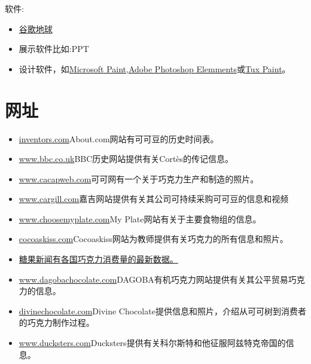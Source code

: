 软件:\par
\begin{itemize}
  \item \href{http://www.earth.google.com}{谷歌地球}
  \item 展示软件比如:PPT
  \item 设计软件，如\href{microsoft.com}{Microsoft Paint},\href{adobe.com}{Adobe Photoshop Elemments}或\href{tuxpaint.org}{Tux Paint}。
\end{itemize}




\section{网址}


\begin{itemize}
  \item \href{http://inventors.about.com/od/foodrelatedinventions/a/chocolate.htm}{inventors.com}About.com网站有可可豆的历史时间表。
  \item \href{http://www.bbc.co.uk/history/historic_ﬁgures/cortes_hernan.shtml}{www.bbc.co.uk}BBC历史网站提供有关Cortès的传记信息。
  \item \href{http://www.cacaoweb.net/cacao-tree.html}{www.cacapweb.com}可可网有一个关于巧克力生产和制造的照片。
  \item \href{https://www.cargill.com/corporate-responsibility/pov/cocoa-sourcing/index.jsp}{www.cargill.com}嘉吉网站提供有关其公司可持续采购可可豆的信息和视频
  \item \href{https://www.choosemyplate.gov}{www.choosemyplate.com}My Plate网站有关于主要食物组的信息。
  \item \href{http://cocoaskiss.blogspot.com}{cocoaskiss.com}Cocoaskiss网站为教师提供有关巧克力的所有信息和照片。
  \item \href{http://www.confectionerynews.com/Markets/Chocolate-consumption-by-country-2014}{糖果新闻有各国巧克力消费量的最新数据。}
  \item \href{https://www.dagobachocolate.com/circle.asp}{www.dagobachocolate.com}DAGOBA有机巧克力网站提供有关其公平贸易巧克力的信息。
  \item \href{http://www.divinechocolate.com/uk/about-us/research-resources/divine-story/bean-to-bar}{divinechocolate.com}Divine Chocolate提供信息和照片，介绍从可可树到消费者的巧克力制作过程。
  \item \href{https://www.ducksters.com/history/aztec_empire/spanish_conquest.php}{www.ducksters.com}Ducksters提供有关科尔斯特和他征服阿兹特克帝国的信息。

\end{itemize}
